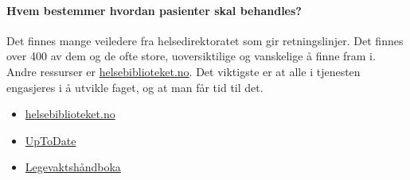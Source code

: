 			\paragraph{Hvem bestemmer hvordan pasienter skal behandles?\\}
				Det finnes mange veiledere fra helsedirektoratet som gir retningslinjer. Det finnes over 400 av dem og de ofte store, uoversiktilige og vanskelige å finne fram i. Andre ressurser er \href{http://www.helsebiblioteket.no/}{helsebiblioteket.no}. Det viktigste er at alle i tjenesten engasjeres i å utvikle faget, og at man får tid til det. 
			\begin{itemize}
				\item \href{http://www.helsebiblioteket.no/}{helsebiblioteket.no}
				\item \href{http://www.uptodate.no/}{UpToDate}
				\item \href{http://www.lvh.no/}{Legevaktshåndboka}
			\end{itemize}
